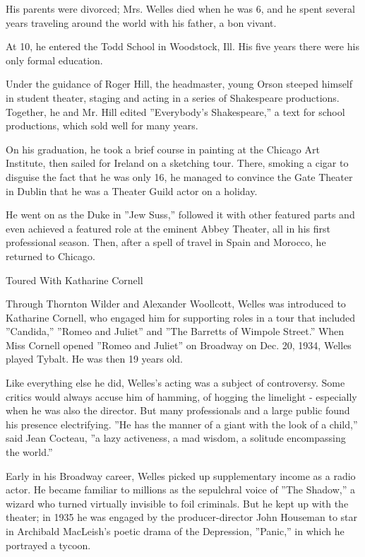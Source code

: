 His parents were divorced; Mrs. Welles died when he was 6, and he spent
several years traveling around the world with his father, a bon vivant.

At 10, he entered the Todd School in Woodstock, Ill. His five years
there were his only formal education.

Under the guidance of Roger Hill, the headmaster, young Orson steeped
himself in student theater, staging and acting in a series of
Shakespeare productions. Together, he and Mr. Hill edited ''Everybody's
Shakespeare,'' a text for school productions, which sold well for many
years.

On his graduation, he took a brief course in painting at the Chicago Art
Institute, then sailed for Ireland on a sketching tour. There, smoking a
cigar to disguise the fact that he was only 16, he managed to convince
the Gate Theater in Dublin that he was a Theater Guild actor on a
holiday.

He went on as the Duke in ''Jew Suss,'' followed it with other featured
parts and even achieved a featured role at the eminent Abbey Theater,
all in his first professional season. Then, after a spell of travel in
Spain and Morocco, he returned to Chicago.

Toured With Katharine Cornell

Through Thornton Wilder and Alexander Woollcott, Welles was introduced
to Katharine Cornell, who engaged him for supporting roles in a tour
that included ''Candida,'' ''Romeo and Juliet'' and ''The Barretts of
Wimpole Street.'' When Miss Cornell opened ''Romeo and Juliet'' on
Broadway on Dec. 20, 1934, Welles played Tybalt. He was then 19 years
old.

Like everything else he did, Welles's acting was a subject of
controversy. Some critics would always accuse him of hamming, of hogging
the limelight - especially when he was also the director. But many
professionals and a large public found his presence electrifying. ''He
has the manner of a giant with the look of a child,'' said Jean Cocteau,
''a lazy activeness, a mad wisdom, a solitude encompassing the world.''

Early in his Broadway career, Welles picked up supplementary income as a
radio actor. He became familiar to millions as the sepulchral voice of
''The Shadow,'' a wizard who turned virtually invisible to foil
criminals. But he kept up with the theater; in 1935 he was engaged by
the producer-director John Houseman to star in Archibald MacLeish's
poetic drama of the Depression, ''Panic,'' in which he portrayed a
tycoon.

